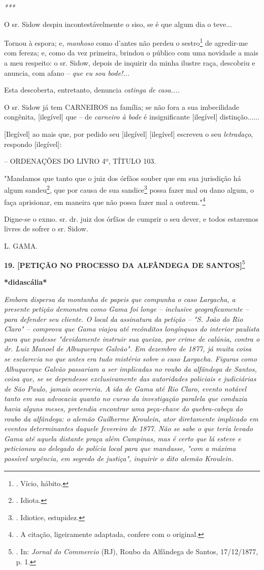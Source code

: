 \emph{***}

O sr. Sidow despiu incontestávelmente o siso, se é que algum dia o
teve...

Tornou à espora; e, \emph{manhoso} como d'antes não perdeu o
sestro\footnote{. Vício, hábito.} de agredir-me com fereza; e, como da
vez primeira, brindou o público com uma novidade a mais a meu respeito:
o sr. Sidow, depois de inquirir da minha ilustre raça, descobriu e
anuncia, com afano -- \emph{que eu sou bode!...}

Esta descoberta, entretanto, denuncia \emph{catinga de casa....}

O sr. Sidow já tem CARNEIROS na família; se não fora a sua imbecilidade
congênita, {[}ilegível{]} que -- de \emph{carneiro à bode} é
insignificante {[}ilegível{]} distinção......

{[}Ilegível{]} ao mais que, por pedido seu {[}ilegível{]} {[}ilegível{]}
escreveu o seu \emph{letradaço}, respondo {[}ilegível{]}:

-- ORDENAÇÕES DO LIVRO 4º, TÍTULO 103.

"Mandamos que tanto que o juiz dos órfãos souber que em sua jurisdição
há algum sandeu\footnote{. Idiota.}, que por causa de sua
sandice\footnote{. Idiotice, estupidez.} possa fazer mal ou dano algum,
o faça aprisionar, em maneira que não possa fazer mal a
outrem."\footnote{. A citação, ligeiramente adaptada, confere com o
  original.}

\protect\hypertarget{Secao_Sem_Titulo-26}{}{}Digne-se o exmo. sr. dr.
juiz dos órfãos de cumprir o seu dever, e todos estaremos livres de
sofrer o sr. Sidow.

L. GAMA.

\textbf{19. {[}PETIÇÃO NO PROCESSO DA ALFÂNDEGA DE SANTOS{]}}\footnote{.
  In: \emph{Jornal do Commercio} (RJ), Roubo da Alfândega de Santos,
  17/12/1877, p. 1.}

\textbf{*didascália*}

\emph{Embora dispersa da montanha de papeis que compunha o caso
Largacha, a presente petição demonstra como Gama foi longe -- inclusive
geograficamente -- para defender seu cliente. O local da assinatura da
petição -- "S. João do Rio Claro" -- comprova que Gama viajou até
recônditos longínquos do interior paulista para que pudesse "devidamente
instruir sua queixa, por crime de calúnia, contra o dr. Luiz Manoel de
Albuquerque Galvão". Em dezembro de 1877, já muita coisa se esclarecia
no que antes era tudo mistério sobre o caso Largacha. Figuras como
Albuquerque Galvão passariam a ser implicadas no roubo da alfândega de
Santos, coisa que, se se dependesse exclusivamente das autoridades
policiais e judiciárias de São Paulo, jamais ocorreria. A ida de Gama
até Rio Claro, evento notável tanto em sua advocacia quanto no curso da
investigação paralela que conduzia havia alguns meses, pretendia
encontrar uma peça-chave do quebra-cabeça do roubo da alfândega: o
alemão Guilherme Kroulein, ator diretamente implicado em eventos
determinantes daquele fevereiro de 1877. Não se sabe o que teria levado
Gama até aquela distante praça além Campinas, mas é certo que lá esteve
e peticionou ao delegado de polícia local para que mandasse, "com a
máxima possível urgência, em segredo de justiça", inquirir o dito alemão
Kroulein. }

